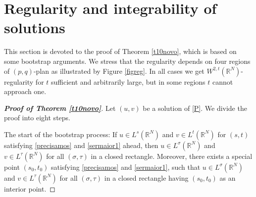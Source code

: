 \documentclass[12pt,a4paper]{article}
\numberwithin{equation}{section}
\begin{document}
\section{Regularity and integrability of solutions}\label{sec-reg}

This section is devoted to the proof of Theorem \ref{t10novo}, which is based on some bootstrap arguments. We stress that the regularity depends on four regions of $(p, q)$-plan as illustrated by Figure \ref{figreg}. In all cases we get $W^{2,t}(\mathbb{R}^N)$-regularity for $t$ sufficient and arbitrarily large, but in some regions $t$ cannot approach one.

\begin{proof}[\bf{Proof of Theorem \ref{t10novo}}]

 Let $(u, v)$ be a solution of \eqref{P}. We divide the proof into eight steps. 
 \medbreak

 The start of the bootstrap process: If $u\in L^s(\mathbb{R}^N)$ and $v \in L^t(\mathbb{R}^N)$ for $(s,t)$ satisfying \eqref{precisamos} and \eqref{sermaior1} ahead, then $u\in L^\sigma(\mathbb{R}^N)$ and $v \in L^\tau(\mathbb{R}^N)$ for all $(\sigma,\tau)$ in a closed rectangle. Moreover, there exists a special point $(s_0, t_0)$ satisfying \eqref{precisamos} and \eqref{sermaior1}, such that $u\in L^\sigma(\mathbb{R}^N)$ and $v \in L^\tau(\mathbb{R}^N)$ for all $(\sigma,\tau)$ in a closed rectangle having $(s_0, t_0)$ as an interior point.



\end{proof}
\end{document}

